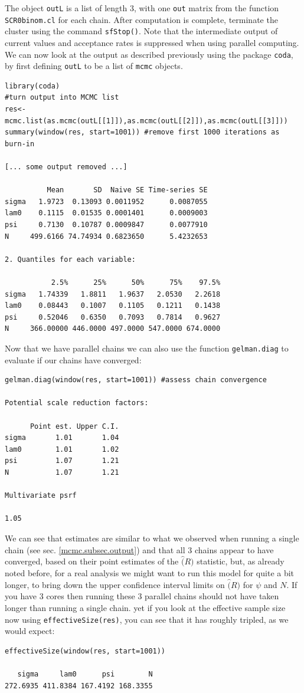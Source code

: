 The object {\tt outL} is a list of length 3, with one {\tt out} matrix from the function {\tt SCR0binom.cl} for each chain. After computation is complete, terminate the cluster using the command {\tt sfStop()}. Note that the intermediate output of current values and acceptance rates is suppressed when using parallel computing. We can now look at the output as described previously using the package {\tt coda}, by first defining {\tt outL} to be a list of {\tt mcmc} objects. 
{\small
\begin{verbatim} 
library(coda)
#turn output into MCMC list
res<-mcmc.list(as.mcmc(outL[[1]]),as.mcmc(outL[[2]]),as.mcmc(outL[[3]]))
summary(window(res, start=1001)) #remove first 1000 iterations as burn-in

[... some output removed ...]

          Mean       SD  Naive SE Time-series SE
sigma   1.9723  0.13093 0.0011952      0.0087055
lam0    0.1115  0.01535 0.0001401      0.0009003
psi     0.7130  0.10787 0.0009847      0.0077910
N     499.6166 74.74934 0.6823650      5.4232653

2. Quantiles for each variable:

           2.5%      25%      50%      75%    97.5%
sigma   1.74339   1.8811   1.9637   2.0530   2.2618
lam0    0.08443   0.1007   0.1105   0.1211   0.1438
psi     0.52046   0.6350   0.7093   0.7814   0.9627
N     366.00000 446.0000 497.0000 547.0000 674.0000
\end{verbatim}
}
Now that we have parallel chains we can also use the function {\tt gelman.diag} to evaluate if our chains have converged:
{\small
\begin{verbatim} 
gelman.diag(window(res, start=1001)) #assess chain convergence

Potential scale reduction factors:

      Point est. Upper C.I.
sigma       1.01       1.04
lam0        1.01       1.02
psi         1.07       1.21
N           1.07       1.21

Multivariate psrf

1.05
\end{verbatim}
}
We can see that estimates are similar to what we observed when running a single chain (see sec. \ref{mcmc.subsec.output}) and that all 3 chains appear to have converged, based on their point estimates of the $\hat(R)$ statistic, but, as already noted before, for a real analysis we might want to run this model for quite a bit longer, to bring down the upper confidence interval limits on $\hat(R)$ for $\psi$ and $N$. If you have 3 cores then running these 3 parallel chains should not have taken longer than running a single chain. yet if you look at the effective sample size now using {\tt effectiveSize(res)}, you can see that it has roughly tripled, as we would expect:
{\small
\begin{verbatim} 
effectiveSize(window(res, start=1001))

   sigma     lam0      psi        N 
272.6935 411.8384 167.4192 168.3355 
\end{verbatim}
}

